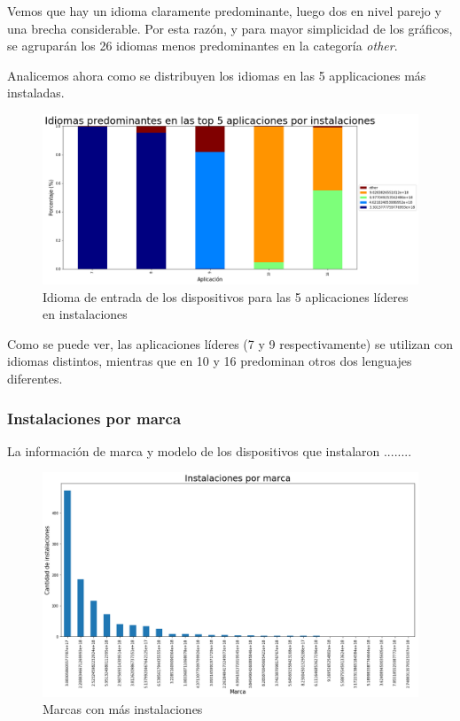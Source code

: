 \documentclass[a4paper, 12pt]{article}
\begin{document}
		Vemos que hay un idioma claramente predominante, luego dos en nivel parejo y una brecha considerable.
		Por esta razón, y para mayor simplicidad de los gráficos, se agruparán los 26 idiomas menos predominantes en la categoría \textit{other}.

		Analicemos ahora como se distribuyen los idiomas en las 5 applicaciones más instaladas.

		\FloatBarrier
		\begin{figure}[h]
			\centering
			\includegraphics[width=\textwidth]{images/installs/idiomasapps.png}
			\caption{Idioma de entrada de los dispositivos para las 5 aplicaciones líderes en instalaciones}
		\end{figure}
		\FloatBarrier

		Como se puede ver, las aplicaciones líderes (7 y 9 respectivamente) se utilizan con idiomas distintos, mientras que en 10 y 16 predominan otros dos lenguajes diferentes.

	\subsubsection{Instalaciones por marca}

		La información de marca y modelo de los dispositivos que instalaron ........

		\FloatBarrier
		\begin{figure}[h]
			\centering
			\includegraphics[width=\textwidth]{images/installs/marcas.png}
			\caption{Marcas con más instalaciones}
		\end{figure}
		\FloatBarrier
\end{document}
